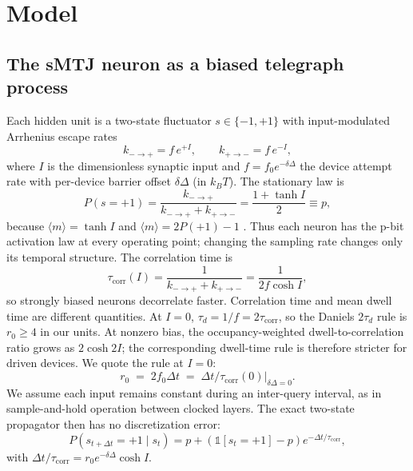 \documentclass[journal]{IEEEtran}
\newcommand{\rzero}{r_0}
\newcommand{\tauc}{\tau_{\mathrm{corr}}}
\begin{document}
\section{Model}
\label{sec:model}

\subsection{The sMTJ neuron as a biased telegraph process}
Each hidden unit is a two-state fluctuator $s \in \{-1,+1\}$ with
input-modulated Arrhenius escape rates
\begin{equation}
k_{-\to+} = f\, e^{+I}, \qquad k_{+\to-} = f\, e^{-I},
\label{eq:rates}
\end{equation}
where $I$ is the dimensionless synaptic input and $f = f_0 e^{-\delta
\Delta}$ the device attempt rate with per-device barrier offset
$\delta\Delta$ (in $k_BT$). The stationary law is
\begin{equation}
P(s{=}{+}1) = \frac{k_{-\to+}}{k_{-\to+}+k_{+\to-}} = \frac{1+\tanh I}{2}
\equiv p,
\label{eq:peq}
\end{equation}
because $\langle m\rangle=\tanh I$ and $\langle m\rangle=2P(+1)-1$
\cite{camsari2017stochastic}. Thus each neuron has the p-bit activation
law at every operating point; changing the sampling rate changes only its
temporal structure. The correlation time is
\begin{equation}
\tauc(I) = \frac{1}{k_{-\to+}+k_{+\to-}} = \frac{1}{2f\cosh I},
\label{eq:tauc}
\end{equation}
so strongly biased neurons decorrelate faster. Correlation time and mean
dwell time are different quantities. At $I{=}0$,
$\tau_d=1/f=2\tauc$, so the Daniels $2\tau_d$ rule
\cite{daniels2020energy} is $\rzero\geq4$ in our units. At nonzero bias,
the occupancy-weighted dwell-to-correlation ratio grows as $2\cosh2I$;
the corresponding dwell-time rule is therefore stricter for driven
devices. We quote the rule at $I{=}0$:
\begin{equation}
\rzero \;=\; 2 f_0 \Delta t \;=\; \Delta t/\tauc(0)\big|_{\delta\Delta=0}.
\end{equation}
We assume each input remains constant during an inter-query interval, as in
sample-and-hold operation between clocked layers. The exact two-state
propagator then has no discretization error:
\begin{equation}
P(s_{t+\Delta t}{=}{+}1 \mid s_t) = p + \left(\mathbb{1}[s_t{=}{+}1] -
p\right) e^{-\Delta t/\tauc},
\label{eq:propagator}
\end{equation}
with $\Delta t/\tauc = \rzero e^{-\delta\Delta}\cosh I$.
\end{document}
